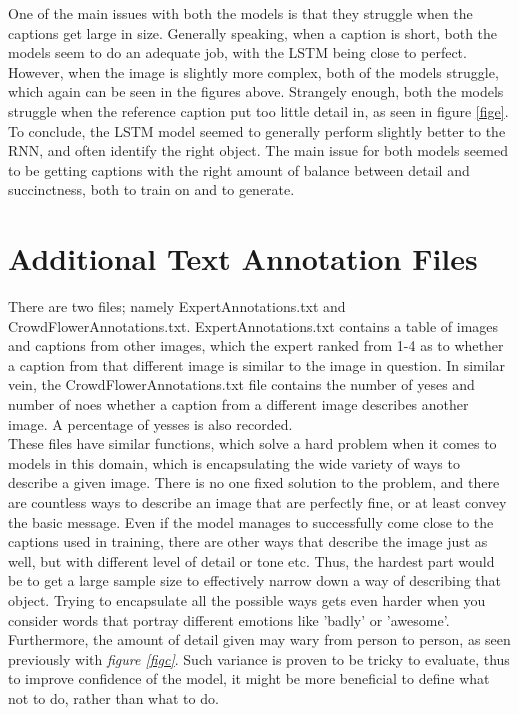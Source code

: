 \documentclass{article}
\begin{document}
    One of the main issues with both the models is that they struggle when the captions get large in size. Generally speaking, when a caption is short, both the models seem to do an adequate job, with the LSTM being close to perfect. However, when the image is slightly more complex, both of the models struggle, which again can be seen in the figures above. Strangely enough, both the models struggle when the reference caption put too little detail in, as seen in figure \ref{fige}.\\

    To conclude, the LSTM model seemed to generally perform slightly better to the RNN, and often identify the right object. The main issue for both models seemed to be getting captions with the right amount of balance between detail and succinctness, both to train on and to generate.



    \section{Additional Text Annotation Files}

    There are two files; namely ExpertAnnotations.txt and CrowdFlowerAnnotations.txt. ExpertAnnotations.txt contains a table of images and captions from other images, which the expert ranked from 1-4 as to whether a caption from that different image is similar to the image in question. In similar vein, the CrowdFlowerAnnotations.txt file contains the number of yeses and number of noes whether a caption from a different image describes another image. A percentage of yesses is also recorded.\\

    These files have similar functions, which solve a hard problem when it comes to models in this domain, which is encapsulating the wide variety of ways to describe a given image. There is no one fixed solution to the problem, and there are countless ways to describe an image that are perfectly fine, or at least convey the basic message. Even if the model manages to successfully come close to the captions used in training, there are other ways that describe the image just as well, but with different level of detail or tone etc. Thus, the hardest part would be to get a large sample size to effectively narrow down a way of describing that object. Trying to encapsulate all the possible ways gets even harder when you consider words that portray different emotions like 'badly' or 'awesome'. Furthermore, the amount of detail given may wary from person to person, as seen previously with \textit{figure \ref{figc}}. Such variance is proven to be tricky to evaluate, thus to improve confidence of the model, it might be more beneficial to define what not to do, rather than what to do.\\ 
\end{document}
